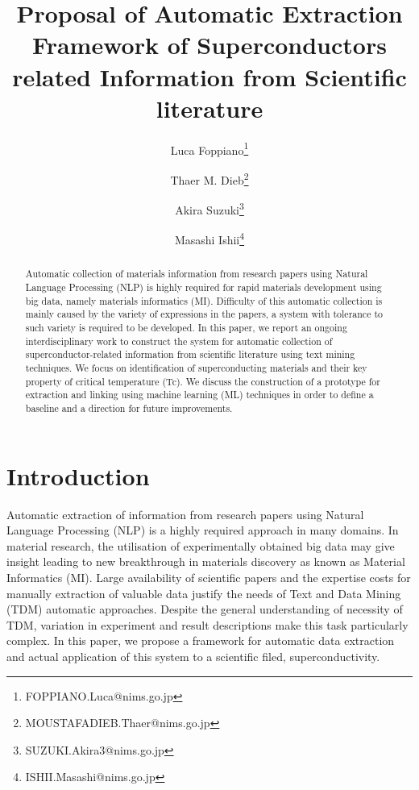 \documentclass{article}[a4]
\title{Proposal of Automatic Extraction Framework of Superconductors related Information from Scientific literature}
\author[1]{Luca Foppiano\thanks{FOPPIANO.Luca@nims.go.jp}}
\author[1]{Thaer M. Dieb\thanks{MOUSTAFADIEB.Thaer@nims.go.jp}}
\author[1]{Akira Suzuki\thanks{SUZUKI.Akira3@nims.go.jp}}
\author[1]{Masashi Ishii\thanks{ISHII.Masashi@nims.go.jp}}
\affil[1]{Research and Services Division of Materials Data and Integrated System (MaDIS), National Institute for Materials Science (NIMS), 1-2-1 Sengen, Tsukuba, Ibaraki 305-0047, Japan}
\begin{document}
\maketitle

\begin{abstract}
Automatic collection of materials information from research papers using Natural Language Processing (NLP) is highly required for rapid materials development using big data, namely materials informatics (MI). Difficulty of this automatic collection is mainly caused by the variety of expressions in the papers, a system with tolerance to such variety is required to be developed. 
In this paper, we report an ongoing interdisciplinary work to construct the system for automatic collection of superconductor-related information from scientific literature using text mining techniques. 
We focus on identification of superconducting materials and their key property of critical temperature (Tc). We discuss the construction of a prototype for extraction and linking using machine learning (ML) techniques in order to define a baseline and a direction for future improvements.
\end{abstract}

\pagebreak





\section{Introduction}

Automatic extraction of information from research papers using Natural Language Processing (NLP) is a highly required approach in many domains. In material research, the utilisation of experimentally obtained big data may give insight leading to new breakthrough in materials discovery as known as Material Informatics (MI). Large availability of scientific papers and the expertise costs for manually extraction of valuable data justify the needs of Text and Data Mining (TDM) automatic approaches.
Despite the general understanding of necessity of TDM, variation in experiment and result descriptions make this task particularly complex. In this paper, we propose a framework for automatic data extraction and actual application of this system to a scientific filed, superconductivity.  
\end{document}
